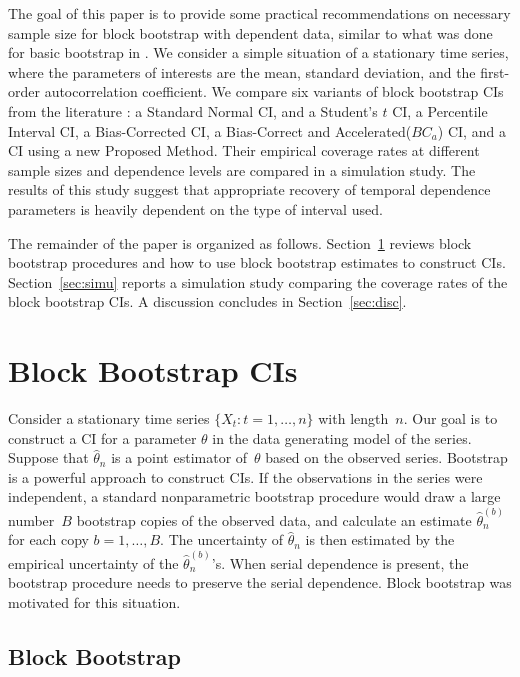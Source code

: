 \documentclass[12pt, letterpaper, titlepage]{article}
\begin{document}
The goal of this paper is to provide some practical recommendations on
necessary sample size for block bootstrap with dependent data, similar to what 
was done for basic bootstrap in \citet{hesterberg2015teachers}. We consider a
simple situation of a stationary time series, where the parameters of
interests are the mean, standard deviation, and the first-order
autocorrelation coefficient. We compare six variants of block bootstrap
CIs from the literature \citep{diciccio1996bootstrap,
  rice2006mathematical}: a Standard Normal CI, and a Student's $t$ CI, a Percentile
Interval CI, 
a Bias-Corrected CI, a Bias-Correct and Accelerated($BC_a$) CI, and a CI using a new
Proposed Method. Their
empirical coverage rates at different sample sizes and dependence levels are
compared in a simulation study. The results of this study suggest that
appropriate recovery of temporal dependence parameters is heavily dependent on
the type of interval used.

The remainder of the paper is organized as follows.
Section~\ref{sec:bbci} reviews block bootstrap procedures and how to use block
bootstrap estimates to construct CIs. Section~\ref{sec:simu} reports a
simulation
study comparing the coverage rates of the block bootstrap CIs. A discussion
concludes in Section~\ref{sec:disc}.

\section{Block Bootstrap CIs}
\label{sec:bbci}

Consider a stationary time series $\{X_t: t = 1, \ldots, n\}$ with length~$n$.
Our goal is to construct a CI for a parameter $\theta$ in the
data generating model of the series. Suppose that $\hat\theta_n$ is a point
estimator of~$\theta$ based on the observed series. Bootstrap is a powerful
approach to construct CIs. If the observations in the series
were independent, a standard nonparametric bootstrap procedure would draw a
large number~$B$ bootstrap copies of the observed data, and calculate an
estimate $\hat\theta_n^{(b)}$ for each copy $b = 1, \ldots, B$. The uncertainty
of $\hat\theta_n$ is then estimated by the empirical uncertainty of the
$\hat\theta_n^{(b)}$'s. When serial dependence is present, the bootstrap
procedure needs to preserve the serial dependence. Block bootstrap was
motivated for this situation. 

\subsection{Block Bootstrap}
\end{document}
